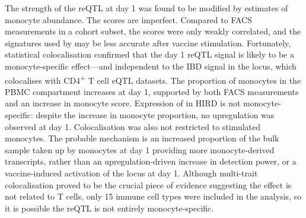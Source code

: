 The strength of the  \gls{reQTL} at day 1 was found to be modified by  estimates of monocyte abundance. 
%
The  scores are imperfect.
Compared to \gls{FACS} measurements in a cohort subset, the  scores were only weakly correlated, and the signatures used by  may be less accurate after vaccine stimulation.
Fortunately, statistical colocalisation confirmed that the day 1  \gls{reQTL} signal is likely to be a monocyte-specific effect---and independent to the \gls{IBD} signal in the locus, which colocalises with CD4\textsuperscript{+} T cell \gls{eQTL} datasets.
The proportion of monocytes in the \gls{PBMC} compartment increases at day 1, supported by both \gls{FACS} \autocite{sobolev2016AdjuvantedInfluenzaH1N1Vaccination} measurements and an increase in monocyte  score.
Expression of  in \gls{HIRD} is not monocyte-specific: despite the increase in monocyte proportion, no upregulation was observed at day 1.
Colocalisation was also not restricted to stimulated monocytes.
The probable mechanism is an increased proportion of the bulk sample taken up by monocytes at day 1 providing more monocyte-derived  transcripts,
rather than an upregulation-driven increase in detection power,
or a vaccine-induced activation of the locus at day 1.
Although multi-trait colocalisation proved to be the crucial piece of evidence suggesting the effect is not related to T cells,
only 15 immune cell types were included in the analysis, so it is possible the \gls{reQTL} is not entirely monocyte-specific.
%
%

